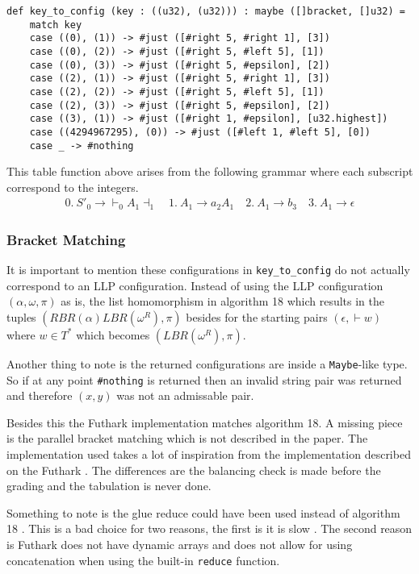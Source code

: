 \begin{lstlisting}[basicstyle=\ttfamily\scriptsize]
def key_to_config (key : ((u32), (u32))) : maybe ([]bracket, []u32) =
    match key
    case ((0), (1)) -> #just ([#right 5, #right 1], [3])
    case ((0), (2)) -> #just ([#right 5, #left 5], [1])
    case ((0), (3)) -> #just ([#right 5, #epsilon], [2])
    case ((2), (1)) -> #just ([#right 5, #right 1], [3])
    case ((2), (2)) -> #just ([#right 5, #left 5], [1])
    case ((2), (3)) -> #just ([#right 5, #epsilon], [2])
    case ((3), (1)) -> #just ([#right 1, #epsilon], [u32.highest])
    case ((4294967295), (0)) -> #just ([#left 1, #left 5], [0])
    case _ -> #nothing
\end{lstlisting}
This table function above arises from the following grammar where each subscript correspond to the integers.
\begin{align*}
    0. \: S'_0 \to \vdash_0 A_1 \dashv_1 \quad 1. \: A_1 \to a_2 A_1 \quad 2. \: A_1 \to b_3 \quad 3. \: A_1 \to \epsilon
\end{align*}

\subsubsection{Bracket Matching}
It is important to mention these configurations in \lstinline|key_to_config| do not actually correspond to an LLP configuration. Instead of using the LLP configuration $(\alpha, \omega, \pi)$ as is, the list homomorphism in algorithm 18 \cite[18]{Vagner2007} which results in the tuples $(RBR(\alpha)LBR(\omega^R), \pi)$ besides for the starting pairs $(\epsilon, \vdash w)$ where $w \in T^*$ which becomes $(LBR(\omega^R), \pi)$.

Another thing to note is the returned configurations are inside a \lstinline|Maybe|-like type. So if at any point \lstinline|#nothing| is returned then an invalid string pair was returned and therefore $(x,y)$ was not an admissable pair.

Besides this the Futhark implementation matches algorithm 18. A missing piece is the parallel bracket matching which is not described in the paper. The implementation used takes a lot of inspiration from the implementation described on the Futhark \cite{futhark:parens}. The differences are the balancing check is made before the grading and the tabulation is never done.

Something to note is the glue \cite[7]{Vagner2007} reduce could have been used instead of algorithm 18 \cite[18]{Vagner2007}. This is a bad choice for two reasons, the first is it is slow \cite[17]{Vagner2007}. The second reason is Futhark does not have dynamic arrays and does not allow for using concatenation when using the built-in \lstinline|reduce| function.

